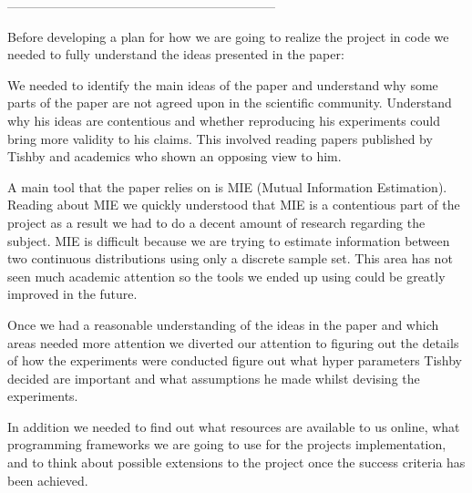 \documentclass[dissertation.tex]{subfiles}
\begin{document}
---------------------------------------------------------------


Before developing a plan for how we are going to realize the project in code we
needed to fully understand the ideas presented in the paper:
\begin{itemize}
    \begin{item}
      We needed to identify the main ideas of the paper and understand why some
      parts of the paper are not agreed upon in the scientific community.
      Understand why his ideas are contentious and whether reproducing his
      experiments could bring more validity to his claims. This involved reading
      papers published by Tishby and academics who shown an opposing view to
      him.
    \end{item}
    \begin{item}
      A main tool that the paper relies on is MIE (Mutual Information
      Estimation). Reading about MIE we quickly understood that MIE is a
      contentious part of the project as a result we had to do a decent amount
      of research regarding the subject. MIE is difficult because we are trying
      to estimate information between two continuous distributions using only a
      discrete sample set. This area has not seen much academic attention so the
      tools we ended up using could be greatly improved in the future.
    \end{item}
\end{itemize}

Once we had a reasonable understanding of the ideas in the paper and which areas
needed more attention we diverted our attention to figuring out the details of
how the experiments were conducted figure out what hyper parameters Tishby
decided are important and what assumptions he made whilst devising the
experiments. 

In addition we needed to find out what resources are available to us online,
what programming frameworks we are going to use for the projects implementation,
and to think about possible extensions to the project once the success criteria
has been achieved.
\end{document}
